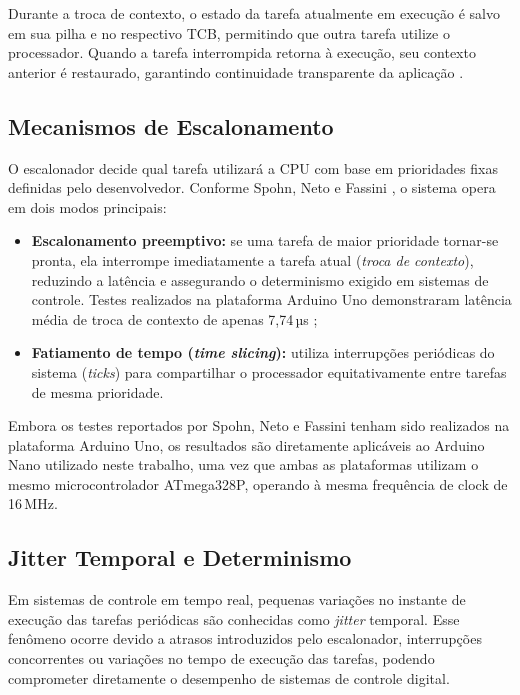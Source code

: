 \documentclass[repeatfields,xlists,xpacks,oneside]{ufrgscca}
\begin{document}
Durante a troca de contexto, o estado da tarefa atualmente em execução é salvo em sua pilha e no respectivo TCB, permitindo que outra tarefa utilize o processador. Quando a tarefa interrompida retorna à execução, seu contexto anterior é restaurado, garantindo continuidade transparente da aplicação \cite{denardin2019rtos}.

\subsection{Mecanismos de Escalonamento}

O escalonador decide qual tarefa utilizará a CPU com base em prioridades fixas definidas pelo desenvolvedor. Conforme Spohn, Neto e Fassini \citeyear{SPOHN:FreeRTOS-Arduino-2019}, o sistema opera em dois modos principais:

\begin{itemize}
    \item \textbf{Escalonamento preemptivo:} se uma tarefa de maior prioridade tornar-se pronta, ela interrompe imediatamente a tarefa atual (\textit{troca de contexto}), reduzindo a latência e assegurando o determinismo exigido em sistemas de controle. Testes realizados na plataforma Arduino Uno demonstraram latência média de troca de contexto de apenas 7,74\,µs \cite{SPOHN:FreeRTOS-Arduino-2019};

    \item \textbf{Fatiamento de tempo (\textit{time slicing}):} utiliza interrupções periódicas do sistema (\textit{ticks}) para compartilhar o processador equitativamente entre tarefas de mesma prioridade.
\end{itemize}

Embora os testes reportados por Spohn, Neto e Fassini \citeyear{SPOHN:FreeRTOS-Arduino-2019} tenham sido realizados na plataforma Arduino Uno, os resultados são diretamente aplicáveis ao Arduino Nano utilizado neste trabalho, uma vez que ambas as plataformas utilizam o mesmo microcontrolador ATmega328P, operando à mesma frequência de clock de 16\,MHz.

\subsection{Jitter Temporal e Determinismo}

Em sistemas de controle em tempo real, pequenas variações no instante de execução das tarefas periódicas são conhecidas como \textit{jitter} temporal. Esse fenômeno ocorre devido a atrasos introduzidos pelo escalonador, interrupções concorrentes ou variações no tempo de execução das tarefas, podendo comprometer diretamente o desempenho de sistemas de controle digital.
\end{document}

